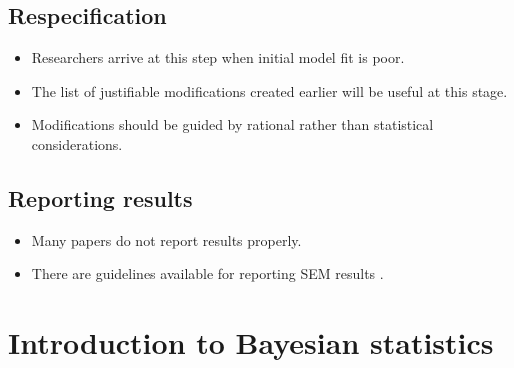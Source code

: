 \documentclass[
]{book}
\providecommand{\tightlist}{%
  \setlength{\itemsep}{0pt}\setlength{\parskip}{0pt}}
\begin{document}
\section{Respecification}\label{respecification}

\begin{itemize}
\tightlist
\item
  Researchers arrive at this step when initial model fit is poor.
\item
  The list of justifiable modifications created earlier will be useful at this stage.
\item
  Modifications should be guided by rational rather than statistical considerations.
\end{itemize}

\section{Reporting results}\label{reporting-results}

\begin{itemize}
\tightlist
\item
  Many papers do not report results properly.
\item
  There are guidelines available for reporting SEM results \citep[p 464, \citet{Appelbaum2018}, pp 16-19]{Boomsma2012, Kline2016}.
\end{itemize}

\chapter{Introduction to Bayesian statistics}\label{introduction-to-bayesian-statistics}
\end{document}
